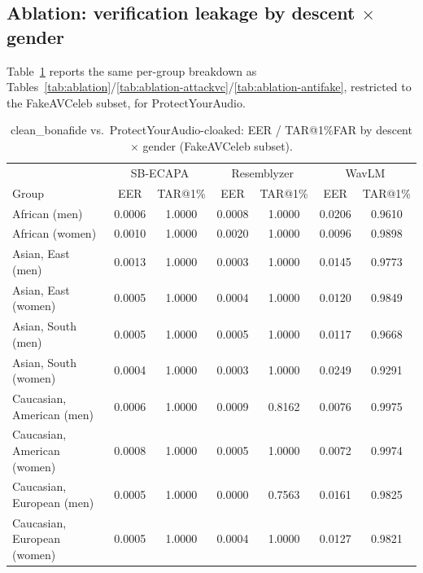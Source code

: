 \documentclass[11pt]{article}
\begin{document}
\subsection{Ablation: verification leakage by descent $\times$ gender}
\label{sec:ablation-protectyouraudio}
Table~\ref{tab:ablation-protectyouraudio} reports the same per-group
breakdown as Tables~\ref{tab:ablation}/\ref{tab:ablation-attackvc}/\ref{tab:ablation-antifake},
restricted to the FakeAVCeleb subset, for ProtectYourAudio.

\begin{table}[H]
\centering
\caption{clean\_bonafide vs.\ ProtectYourAudio-cloaked: EER /
TAR@1\%FAR by descent $\times$ gender (FakeAVCeleb subset).}
\label{tab:ablation-protectyouraudio}
\begin{tabular}{lcccccc}
\toprule
& \multicolumn{2}{c}{SB-ECAPA} & \multicolumn{2}{c}{Resemblyzer} & \multicolumn{2}{c}{WavLM} \\
Group & EER & TAR@1\% & EER & TAR@1\% & EER & TAR@1\% \\
\midrule
African (men)               & 0.0006 & 1.0000 & 0.0008 & 1.0000 & 0.0206 & 0.9610 \\
African (women)              & 0.0010 & 1.0000 & 0.0020 & 1.0000 & 0.0096 & 0.9898 \\
Asian, East (men)            & 0.0013 & 1.0000 & 0.0003 & 1.0000 & 0.0145 & 0.9773 \\
Asian, East (women)          & 0.0005 & 1.0000 & 0.0004 & 1.0000 & 0.0120 & 0.9849 \\
Asian, South (men)           & 0.0005 & 1.0000 & 0.0005 & 1.0000 & 0.0117 & 0.9668 \\
Asian, South (women)         & 0.0004 & 1.0000 & 0.0003 & 1.0000 & 0.0249 & 0.9291 \\
Caucasian, American (men)    & 0.0006 & 1.0000 & 0.0009 & 0.8162 & 0.0076 & 0.9975 \\
Caucasian, American (women)  & 0.0008 & 1.0000 & 0.0005 & 1.0000 & 0.0072 & 0.9974 \\
Caucasian, European (men)    & 0.0005 & 1.0000 & 0.0000 & 0.7563 & 0.0161 & 0.9825 \\
Caucasian, European (women)  & 0.0005 & 1.0000 & 0.0004 & 1.0000 & 0.0127 & 0.9821 \\
\bottomrule
\end{tabular}
\end{table}
\end{document}
